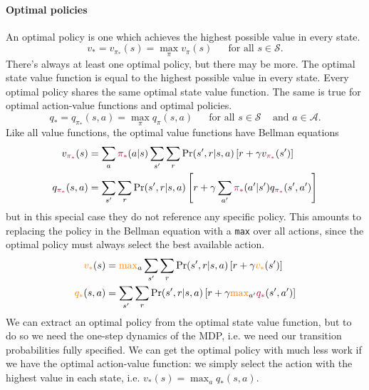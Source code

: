 \documentclass[12pt]{article}
\begin{document}
\paragraph{Optimal policies} An optimal policy is one which achieves the highest possible value in every state.
\[
  v_* = v_{\pi_*}(s) = \max_\pi v_\pi(s) \hspace{15pt} \textrm{ for all } s \in \mathcal S.
  \]
There's always at least one optimal policy, but there may be more. The optimal state value function is equal to the highest possible value in every state. Every optimal policy shares the same optimal state value function. The same is true for optimal action-value functions and optimal policies.
\[
  q_* = q_{\pi_*}(s,a) = \max_\pi q_\pi(s,a) \hspace{15pt} \textrm{ for all } s \in \mathcal S \hspace{10pt} \textrm{ and } a \in \mathcal A.
\]
Like all value functions, the optimal value functions have Bellman equations
\begin{align*}
  v_{\color{purple}{\pi_*}}(s) &= \sum_a {\color{purple}\pi_*} (a|s) \sum_{s'}                                  \sum_r \Pr(s',r|s,a) \left[r + \gamma v_{\color{purple} \pi_*}(s')\right] \\
  q_{\color{purple}\pi_*}(s,a) &= \sum_{s'} \sum_r \Pr(s',r|s,a) \left[ r + \gamma \sum_{a'} {\color{purple} \pi_*}(a'|s') q_{\color{purple} \pi_*}(s',a')\right]
\end{align*}
but in this special case they do not reference any specific policy.
This amounts to replacing the policy in the Bellman equation with a \texttt{max} over all actions, since the optimal policy must always select the best available action.
\begin{align*}
  \color{orange}v_* \color{black}(s) &= {\color{orange}\max}_a \sum_{s'}                                  \sum_r \Pr(s',r|s,a) \left[r + \gamma {\color{orange}v_*}(s')\right] \\
  {\color{orange} q_*}(s,a) &= \sum_{s'} \sum_r \Pr(s',r|s,a) \left[ r + \gamma {\color{orange}\max}_{a'} {\color{purple} q_*}(s',a')\right]
\end{align*}
We can extract an optimal policy from the optimal state value function, but to do so we need the one-step dynamics of the MDP, i.e. we need our transition probabilities fully specified. We can get the optimal policy with much less work if we have the optimal action-value function: we simply select the action with the highest value in each state, i.e. $v_*(s) = \max_a q_*(s,a)$.
\end{document}
